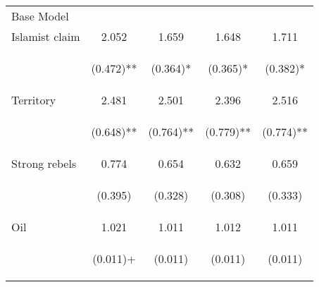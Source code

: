 \begin{center}
\begin{tabular}{lcccc}
\hline \noalign{\smallskip}Base Model &  &  &  & \\
\noalign{\smallskip}\hline \noalign{\smallskip}Islamist claim & 2.052 & 1.659 & 1.648 & 1.711\\
 & \begin{footnotesize}(0.472)**\end{footnotesize} & \begin{footnotesize}(0.364)*\end{footnotesize} & \begin{footnotesize}(0.365)*\end{footnotesize} & \begin{footnotesize}(0.382)*\end{footnotesize}\\
\noalign{\smallskip}Territory & 2.481 & 2.501 & 2.396 & 2.516\\
 & \begin{footnotesize}(0.648)**\end{footnotesize} & \begin{footnotesize}(0.764)**\end{footnotesize} & \begin{footnotesize}(0.779)**\end{footnotesize} & \begin{footnotesize}(0.774)**\end{footnotesize}\\
\noalign{\smallskip}Strong rebels & 0.774 & 0.654 & 0.632 & 0.659\\
 & \begin{footnotesize}(0.395)\end{footnotesize} & \begin{footnotesize}(0.328)\end{footnotesize} & \begin{footnotesize}(0.308)\end{footnotesize} & \begin{footnotesize}(0.333)\end{footnotesize}\\
\noalign{\smallskip}Oil & 1.021 & 1.011 & 1.012 & 1.011\\
 & \begin{footnotesize}(0.011)+\end{footnotesize} & \begin{footnotesize}(0.011)\end{footnotesize} & \begin{footnotesize}(0.011)\end{footnotesize} & \begin{footnotesize}(0.011)\end{footnotesize}\\

\end{tabular}
\end{center}
